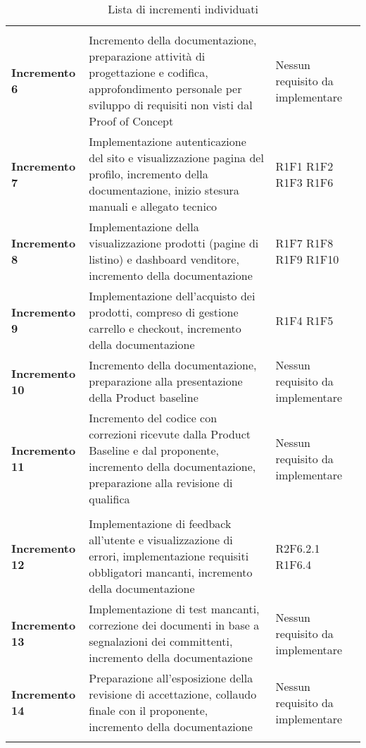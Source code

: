 {\begin{longtable}{C{3cm} C{8cm} C{3cm} }
\\
\textbf{Incremento 6} & Incremento della documentazione, preparazione attività di progettazione e codifica, approfondimento personale per sviluppo di requisiti non visti dal Proof of Concept & Nessun requisito da implementare \\
\textbf{Incremento 7} & Implementazione autenticazione del sito e visualizzazione pagina del profilo, incremento della documentazione, inizio stesura manuali e allegato tecnico & R1F1 \newline R1F2 \newline R1F3 \newline R1F6 \\
\textbf{Incremento 8} & Implementazione della visualizzazione prodotti (pagine di listino) e dashboard venditore, incremento della documentazione & R1F7 \newline R1F8 \newline R1F9 \newline R1F10 \\
\textbf{Incremento 9} & Implementazione dell'acquisto dei prodotti, compreso di gestione carrello e checkout, incremento della documentazione & R1F4 \newline R1F5\\
\textbf{Incremento 10} & Incremento della documentazione, preparazione alla presentazione della Product baseline & Nessun requisito da implementare \\
\textbf{Incremento 11} & Incremento del codice con correzioni ricevute dalla Product Baseline e dal proponente, incremento della documentazione, preparazione alla revisione di qualifica & Nessun requisito da implementare \\

\\
\textbf{Incremento 12} & Implementazione di feedback all'utente e visualizzazione di errori, implementazione requisiti obbligatori mancanti, incremento della documentazione & R2F6.2.1 \newline R1F6.4 \\
\textbf{Incremento 13} & Implementazione di test mancanti, correzione dei documenti in base a segnalazioni dei committenti, incremento della documentazione & Nessun requisito da implementare \\
\textbf{Incremento 14} & Preparazione all'esposizione della revisione di accettazione, collaudo finale con il proponente, incremento della documentazione & Nessun requisito da implementare \\



\caption{Lista di incrementi individuati}

\end{longtable}
}
